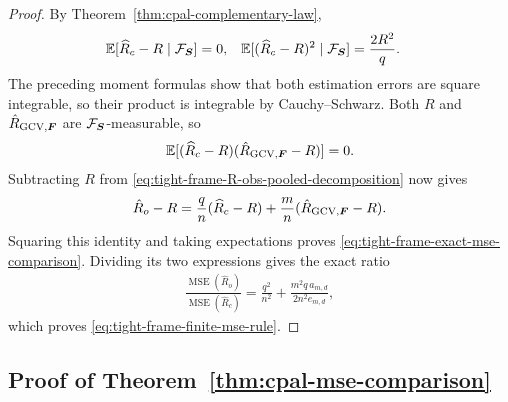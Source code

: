 \documentclass{article}
\theoremstyle{plain} %
\theoremstyle{definition} %
\theoremstyle{definition} %
\newcommand{\GCV}{{\text{GCV}}}
\newcommand{\hR}{\hat{R}}
\begin{document}
\begin{proof}
By Theorem~\ref{thm:cpal-complementary-law},
\begin{align*}
    {\mathbb{E}}[\widehat R_c-R\mid{\mathcal F}_{\boldsymbol{S}}]&=0,
    &{\mathbb{E}}[(\widehat R_c-R)^2\mid{\mathcal F}_{\boldsymbol{S}}]
       &=\frac{2R^2}{q}.
\end{align*}
The preceding moment formulas show that both estimation errors are square
integrable, so their product is integrable by Cauchy--Schwarz.
Both $R$ and $\hR_{\GCV,\bF}$ are ${\mathcal F}_{\boldsymbol{S}}$-measurable, so
\begin{align*}
    \E[(\widehat R_c-R)(\hR_{\GCV,\bF}-R)]=0.
\end{align*}
Subtracting $R$ from
\eqref{eq:tight-frame-R-obs-pooled-decomposition} now gives
\begin{align*}
    \hR_o-R
    =\frac qn(\widehat R_c-R)
      +\frac mn(\hR_{\GCV,\bF}-R).
\end{align*}
Squaring this identity and taking expectations proves
\eqref{eq:tight-frame-exact-mse-comparison}. Dividing its two expressions
gives the exact ratio
\begin{align*}
    \frac{\operatorname{MSE}(\hR_o)}
         {\operatorname{MSE}(\widehat R_c)}
    =\frac{q^2}{n^2}+\frac{m^2q\,a_{m,d}}{2n^2e_{m,d}},
\end{align*}
which proves \eqref{eq:tight-frame-finite-mse-rule}.
\end{proof}

\subsection{Proof of Theorem~\ref{thm:cpal-mse-comparison}}
\label{app:proof-tight-frame-asymptotic-mse-threshold}
\end{document}
